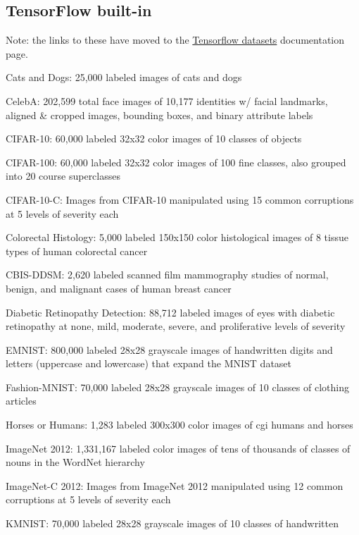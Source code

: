 \documentclass{tufte-handout}
\begin{document}
\subsection*{TensorFlow built-in}\label{tensorflow-built-in-datasets}

Note: the links to these have moved to the \href{https://www.tensorflow.org/datasets/catalog/overview#all_datasets}{Tensorflow datasets} documentation page.

\bi
\item
Cats and Dogs: 25,000 labeled images of cats and dogs
\item
CelebA: 202,599 total face images of 10,177 identities w/ facial landmarks,
  aligned \& cropped images, bounding boxes, and binary attribute labels
\item
  CIFAR-10:
  60,000 labeled 32x32 color images of 10 classes of objects
\item
CIFAR-100:
  60,000 labeled 32x32 color images of 100 fine classes, also grouped
  into 20 course superclasses
\item
 CIFAR-10-C:
  Images from CIFAR-10 manipulated using 15 common corruptions at 5
  levels of severity each
\item
Colorectal Histology: 5,000 labeled 150x150 color histological images of 8
  tissue types of human colorectal cancer
\item
CBIS-DDSM:
  2,620 labeled scanned film mammography studies of normal, benign, and
  malignant cases of human breast cancer
\item
 Diabetic
  Retinopathy Detection: 88,712 labeled images of eyes with diabetic
  retinopathy at none, mild, moderate, severe, and proliferative levels
  of severity
\item
EMNIST:
  800,000 labeled 28x28 grayscale images of handwritten digits and
  letters (uppercase and lowercase) that expand the MNIST dataset
\item
  Fashion-MNIST:
  70,000 labeled 28x28 grayscale images of 10 classes of clothing
  articles
\item
 Horses
  or Humans: 1,283 labeled 300x300 color images of cgi humans and
  horses
\item
ImageNet
  2012: 1,331,167 labeled color images of tens of thousands of classes
  of nouns in the WordNet hierarchy
\item
  ImageNet-C
  2012: Images from ImageNet 2012 manipulated using 12 common
  corruptions at 5 levels of severity each
\item
 KMNIST:
  70,000 labeled 28x28 grayscale images of 10 classes of handwritten
\end{document}
